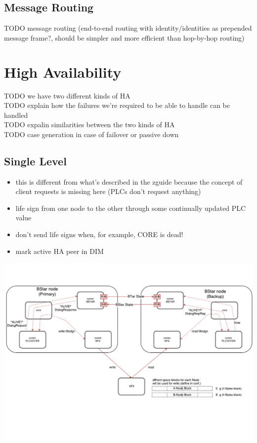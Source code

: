 \subsection{Message Routing}
TODO message routing (end-to-end routing with identity/identities as prepended message frame?, should be simpler and more efficient than hop-by-hop routing)\\

\section{High Availability}\label{sec:meth:ha}
TODO we have two different kinds of HA\\
TODO explain how the failures we're required to be able to handle can be handled\\
TODO expalin similarities between the two kinds of HA\\
TODO case generation in case of failover or passive down\\

\subsection{Single Level}
\begin{itemize}
	\item this is different from what's described in the zguide because the concept of client requests is missing here (PLCs don't request anything)
	\item life sign from one node to the other through some continually updated PLC value
	\item don't send life signs when, for example, CORE is dead!
	\item mark active HA peer in DIM
\end{itemize}

\includegraphics[width=\textwidth]{img/SL-HA_bstar.pdf}

